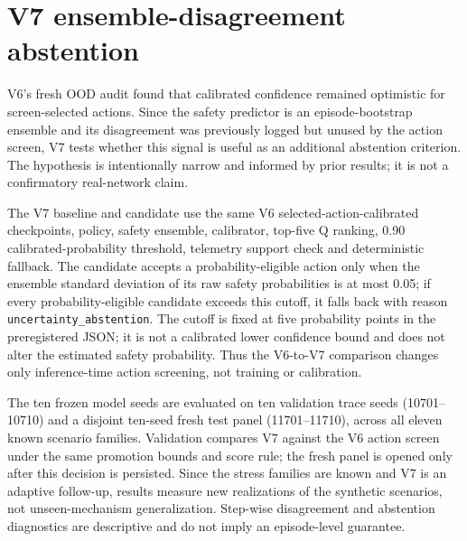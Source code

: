 \documentclass[10pt]{article}
\providecommand{\actioncalpath}{generated-action-calibration-v6}
\begin{document}
\begin{table}[t]
\centering\resizebox{\textwidth}{!}{}
\caption{V6 selected-action confidence against fresh one-step safety labels. Entries are means with 95\% seed-bootstrap intervals; counts are steps, not independent samples, and changed-action rows condition on screen interventions.}
\label{tab:v6-action-calibration}
\end{table}

\section{V7 ensemble-disagreement abstention}
V6's fresh OOD audit found that calibrated confidence remained optimistic for screen-selected actions. Since the safety predictor is an episode-bootstrap ensemble and its disagreement was previously logged but unused by the action screen, V7 tests whether this signal is useful as an additional abstention criterion. The hypothesis is intentionally narrow and informed by prior results; it is not a confirmatory real-network claim.

The V7 baseline and candidate use the same V6 selected-action-calibrated checkpoints, policy, safety ensemble, calibrator, top-five Q ranking, 0.90 calibrated-probability threshold, telemetry support check and deterministic fallback. The candidate accepts a probability-eligible action only when the ensemble standard deviation of its raw safety probabilities is at most 0.05; if every probability-eligible candidate exceeds this cutoff, it falls back with reason \texttt{uncertainty\_abstention}. The cutoff is fixed at five probability points in the preregistered JSON; it is not a calibrated lower confidence bound and does not alter the estimated safety probability. Thus the V6-to-V7 comparison changes only inference-time action screening, not training or calibration.

The ten frozen model seeds are evaluated on ten validation trace seeds (10701--10710) and a disjoint ten-seed fresh test panel (11701--11710), across all eleven known scenario families. Validation compares V7 against the V6 action screen under the same promotion bounds and score rule; the fresh panel is opened only after this decision is persisted. Since the stress families are known and V7 is an adaptive follow-up, results measure new realizations of the synthetic scenarios, not unseen-mechanism generalization. Step-wise disagreement and abstention diagnostics are descriptive and do not imply an episode-level guarantee.
\end{document}
